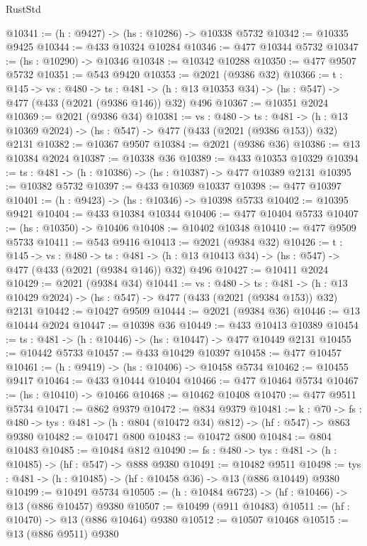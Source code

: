 \begin{lexlean}{RustStd}
\begin{coremodule}
{\begin{coremodule}
{{{{{{{{{{{{{{{{@10341 := (h : @9427) -> (hs : @10286) -> @10338 @5732
@10342 := @10335 @9425
@10344 := @433 @10324 @10284
@10346 := @477 @10344 @5732
@10347 := (hs : @10290) -> @10346
@10348 := @10342 @10288
@10350 := @477 @9507 @5732
@10351 := @543 @9420
@10353 := @2021 (@9386 @32)
@10366 := {t : @145} ->
  {vs : @480} ->
  {ts : @481} -> (h : @13 @10353 @34) -> (hs : @547) -> @477 (@433 (@2021 (@9386 @146)) @32) @496
@10367 := @10351 @2024
@10369 := @2021 (@9386 @34)
@10381 := {vs : @480} ->
  {ts : @481} -> (h : @13 @10369 @2024) -> (hs : @547) -> @477 (@433 (@2021 (@9386 @153)) @32) @2131
@10382 := @10367 @9507
@10384 := @2021 (@9386 @36)
@10386 := @13 @10384 @2024
@10387 := @10338 @36
@10389 := @433 @10353 @10329
@10394 := {ts : @481} -> (h : @10386) -> (hs : @10387) -> @477 @10389 @2131
@10395 := @10382 @5732
@10397 := @433 @10369 @10337
@10398 := @477 @10397
@10401 := (h : @9423) -> (hs : @10346) -> @10398 @5733
@10402 := @10395 @9421
@10404 := @433 @10384 @10344
@10406 := @477 @10404 @5733
@10407 := (hs : @10350) -> @10406
@10408 := @10402 @10348
@10410 := @477 @9509 @5733
@10411 := @543 @9416
@10413 := @2021 (@9384 @32)
@10426 := {t : @145} ->
  {vs : @480} ->
  {ts : @481} -> (h : @13 @10413 @34) -> (hs : @547) -> @477 (@433 (@2021 (@9384 @146)) @32) @496
@10427 := @10411 @2024
@10429 := @2021 (@9384 @34)
@10441 := {vs : @480} ->
  {ts : @481} -> (h : @13 @10429 @2024) -> (hs : @547) -> @477 (@433 (@2021 (@9384 @153)) @32) @2131
@10442 := @10427 @9509
@10444 := @2021 (@9384 @36)
@10446 := @13 @10444 @2024
@10447 := @10398 @36
@10449 := @433 @10413 @10389
@10454 := {ts : @481} -> (h : @10446) -> (hs : @10447) -> @477 @10449 @2131
@10455 := @10442 @5733
@10457 := @433 @10429 @10397
@10458 := @477 @10457
@10461 := (h : @9419) -> (hs : @10406) -> @10458 @5734
@10462 := @10455 @9417
@10464 := @433 @10444 @10404
@10466 := @477 @10464 @5734
@10467 := (hs : @10410) -> @10466
@10468 := @10462 @10408
@10470 := @477 @9511 @5734
@10471 := @862 @9379
@10472 := @834 @9379
@10481 := {k : @70} ->
  {fs : @480} -> {tys : @481} -> (h : @804 (@10472 @34) @812) -> (hf : @547) -> @863 @9380
@10482 := @10471 @800
@10483 := @10472 @800
@10484 := @804 @10483
@10485 := @10484 @812
@10490 := {fs : @480} -> {tys : @481} -> (h : @10485) -> (hf : @547) -> @888 @9380
@10491 := @10482 @9511
@10498 := {tys : @481} -> (h : @10485) -> (hf : @10458 @36) -> @13 (@886 @10449) @9380
@10499 := @10491 @5734
@10505 := (h : @10484 @6723) -> (hf : @10466) -> @13 (@886 @10457) @9380
@10507 := @10499 (@911 @10483)
@10511 := (hf : @10470) -> @13 (@886 @10464) @9380
@10512 := @10507 @10468
@10515 := @13 (@886 @9511) @9380
}}}}}}}}}}}}}}}}
\end{coremodule}}
\end{coremodule}
\end{lexlean}
